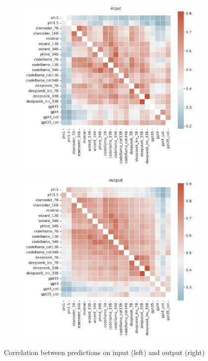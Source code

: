 \documentclass{article}
\begin{document}
\begin{figure}[H]
     \centering
     \begin{subfigure}[b]{0.49\textwidth}
         \centering
         \includegraphics[width=1\textwidth]{figs/error_correlation_input_heatmap.pdf}
     \end{subfigure}
     \hfill
     \begin{subfigure}[b]{0.49\textwidth}
         \centering
         \includegraphics[width=1\textwidth]{figs/error_correlation_output_heatmap.pdf}
     \end{subfigure}
     \caption{Correlation between predictions on input (left) and output (right)}
     \label{fig:error_corr-input-output}
\end{figure}
\end{document}
